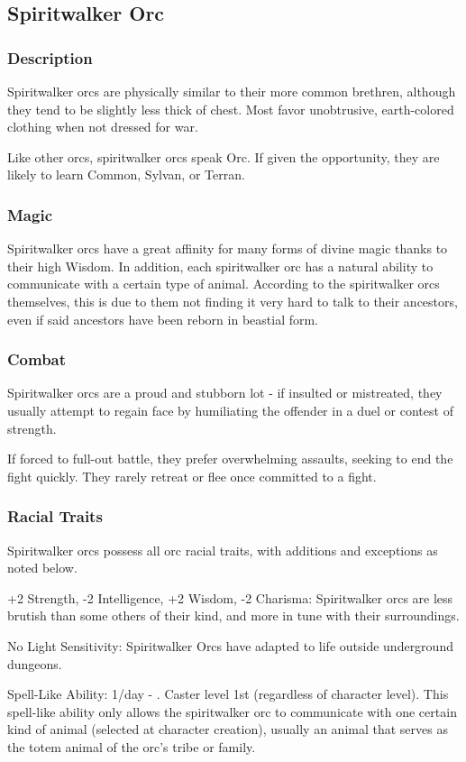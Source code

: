 \subsection{Spiritwalker Orc}
\subsubsection{Description}
Spiritwalker orcs are physically similar to their more common brethren, although they tend to be slightly less thick of chest. Most favor unobtrusive, earth-colored clothing when not dressed for war. %

Like other orcs, spiritwalker orcs speak Orc. If given the opportunity, they are likely to learn Common, Sylvan, or Terran.
\subsubsection{Magic}
Spiritwalker orcs have a great affinity for many forms of divine magic thanks to their high Wisdom. In addition, each spiritwalker orc has a natural ability to communicate with a certain type of animal. According to the spiritwalker orcs themselves, this is due to them not finding it very hard to talk to their ancestors, even if said ancestors have been reborn in beastial form.
\subsubsection{Combat}
Spiritwalker orcs are a proud and stubborn lot - if insulted or mistreated, they usually attempt to regain face by humiliating the offender in a duel or contest of strength. 

If forced to full-out battle, they prefer overwhelming assaults, seeking to end the fight quickly. They rarely retreat or flee once committed to a fight.
\subsubsection{Racial Traits}
Spiritwalker orcs possess all orc racial traits, with additions and exceptions as noted below.
\begin{list}{}{\leftmargin=1em}
 \item +2 Strength, -2 Intelligence, +2 Wisdom, -2 Charisma: Spiritwalker orcs are less brutish than some others of their kind, and more in tune with their surroundings.
 \item No Light Sensitivity: Spiritwalker Orcs have adapted to life outside underground dungeons.
 \item Spell-Like Ability: 1/day - . Caster level 1st (regardless of character level). This spell-like ability only allows the spiritwalker orc to communicate with one certain kind of animal (selected at character creation), usually an animal that serves as the totem animal of the orc's tribe or family.
\end{list}